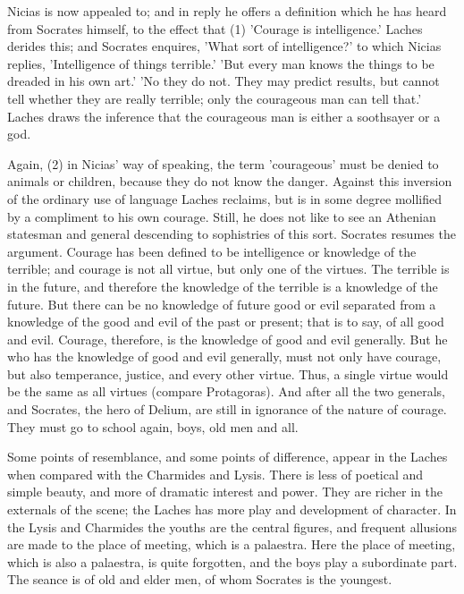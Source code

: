 \documentclass[11pt,letter]{book}
\begin{document}
\par  Nicias is now appealed to; and in reply he offers a definition which he has heard from Socrates himself, to the effect that (1) 'Courage is intelligence.' Laches derides this; and Socrates enquires, 'What sort of intelligence?' to which Nicias replies, 'Intelligence of things terrible.' 'But every man knows the things to be dreaded in his own art.' 'No they do not. They may predict results, but cannot tell whether they are really terrible; only the courageous man can tell that.' Laches draws the inference that the courageous man is either a soothsayer or a god.

\par  Again, (2) in Nicias' way of speaking, the term 'courageous' must be denied to animals or children, because they do not know the danger. Against this inversion of the ordinary use of language Laches reclaims, but is in some degree mollified by a compliment to his own courage. Still, he does not like to see an Athenian statesman and general descending to sophistries of this sort. Socrates resumes the argument. Courage has been defined to be intelligence or knowledge of the terrible; and courage is not all virtue, but only one of the virtues. The terrible is in the future, and therefore the knowledge of the terrible is a knowledge of the future. But there can be no knowledge of future good or evil separated from a knowledge of the good and evil of the past or present; that is to say, of all good and evil. Courage, therefore, is the knowledge of good and evil generally. But he who has the knowledge of good and evil generally, must not only have courage, but also temperance, justice, and every other virtue. Thus, a single virtue would be the same as all virtues (compare Protagoras). And after all the two generals, and Socrates, the hero of Delium, are still in ignorance of the nature of courage. They must go to school again, boys, old men and all.

\par  Some points of resemblance, and some points of difference, appear in the Laches when compared with the Charmides and Lysis. There is less of poetical and simple beauty, and more of dramatic interest and power. They are richer in the externals of the scene; the Laches has more play and development of character. In the Lysis and Charmides the youths are the central figures, and frequent allusions are made to the place of meeting, which is a palaestra. Here the place of meeting, which is also a palaestra, is quite forgotten, and the boys play a subordinate part. The seance is of old and elder men, of whom Socrates is the youngest.
\end{document}

